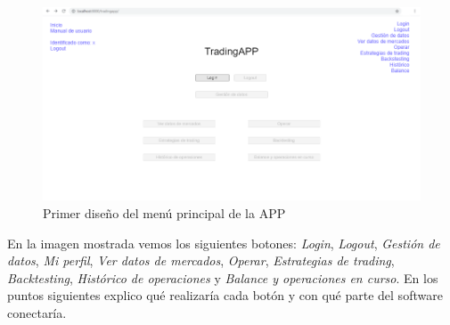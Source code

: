 \begin{figure}[h] \label{menu_principal}
	\includegraphics[width=1.2\textwidth]{imagenes/menu_principal}
	\caption{Primer diseño del menú principal de la APP}
\end{figure}

En la imagen mostrada vemos los siguientes botones: \textit{Login}, \textit{Logout}, \textit{Gestión de datos},\textit{ Mi perfil}, \textit{Ver datos de mercados}, \textit{Operar}, \textit{Estrategias de trading}, \textit{Backtesting}, \textit{Histórico de operaciones} y \textit{Balance y operaciones en curso}. En los puntos siguientes explico qué realizaría cada botón y con qué parte del software conectaría.\newline

